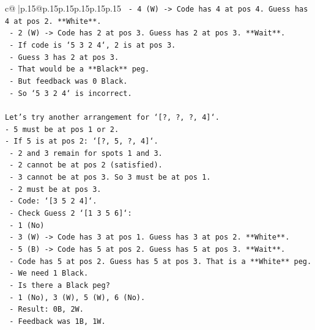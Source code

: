 \documentclass{article}
\begin{document}
{\begin{supertabular}{c@{$\;$}|p{.15\linewidth}@{}p{.15\linewidth}p{.15\linewidth}p{.15\linewidth}p{.15\linewidth}p{.15\linewidth}}
{{{\texttt{            {-}   4 (W) {-}> Code has 4 at pos 4. Guess has 4 at pos 2. **White**.} \\
\texttt{            {-}   2 (W) {-}> Code has 2 at pos 3. Guess has 2 at pos 3. **Wait**.} \\
\texttt{                {-}   If code is `5 3 2 4`, 2 is at pos 3.} \\
\texttt{                {-}   Guess 3 has 2 at pos 3.} \\
\texttt{                {-}   That would be a **Black** peg.} \\
\texttt{                {-}   But feedback was 0 Black.} \\
\texttt{                {-}   So `5 3 2 4` is incorrect.} \\
\\ 
\texttt{Let's try another arrangement for `{[}?, ?, ?, 4{]}`.} \\
\texttt{{-}   5 must be at pos 1 or 2.} \\
\texttt{{-}   If 5 is at pos 2: `{[}?, 5, ?, 4{]}`.} \\
\texttt{    {-}   2 and 3 remain for spots 1 and 3.} \\
\texttt{    {-}   2 cannot be at pos 2 (satisfied).} \\
\texttt{    {-}   3 cannot be at pos 3. So 3 must be at pos 1.} \\
\texttt{    {-}   2 must be at pos 3.} \\
\texttt{    {-}   Code: `{[}3 5 2 4{]}`.} \\
\texttt{    {-}   Check Guess 2 `{[}1 3 5 6{]}`:} \\
\texttt{        {-}   1 (No)} \\
\texttt{        {-}   3 (W) {-}> Code has 3 at pos 1. Guess has 3 at pos 2. **White**.} \\
\texttt{        {-}   5 (B) {-}> Code has 5 at pos 2. Guess has 5 at pos 3. **Wait**.} \\
\texttt{            {-}   Code has 5 at pos 2. Guess has 5 at pos 3. That is a **White** peg.} \\
\texttt{            {-}   We need 1 Black.} \\
\texttt{            {-}   Is there a Black peg?} \\
\texttt{            {-}   1 (No), 3 (W), 5 (W), 6 (No).} \\
\texttt{            {-}   Result: 0B, 2W.} \\
\texttt{            {-}   Feedback was 1B, 1W.} \\
}}}
\end{supertabular}}
\end{document}

